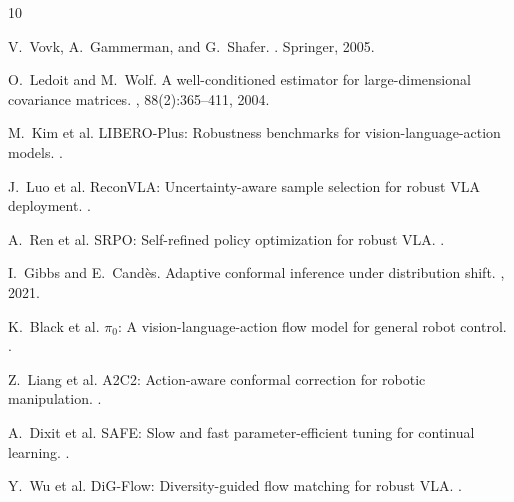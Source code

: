 \documentclass[letterpaper]{article}
\begin{document}
\begin{thebibliography}{10}

V.~Vovk, A.~Gammerman, and G.~Shafer.
.
\newblock Springer, 2005.

O.~Ledoit and M.~Wolf.
\newblock A well-conditioned estimator for large-dimensional covariance matrices.
, 88(2):365--411, 2004.

M.~Kim et al.
\newblock LIBERO-Plus: Robustness benchmarks for vision-language-action models.
.

J.~Luo et al.
\newblock ReconVLA: Uncertainty-aware sample selection for robust VLA deployment.
.

A.~Ren et al.
\newblock SRPO: Self-refined policy optimization for robust VLA.
.

I.~Gibbs and E.~Cand\`es.
\newblock Adaptive conformal inference under distribution shift.
, 2021.

K.~Black et al.
\newblock $\pi_0$: A vision-language-action flow model for general robot control.
.

Z.~Liang et al.
\newblock A2C2: Action-aware conformal correction for robotic manipulation.
.

A.~Dixit et al.
\newblock SAFE: Slow and fast parameter-efficient tuning for continual learning.
.

Y.~Wu et al.
\newblock DiG-Flow: Diversity-guided flow matching for robust VLA.
.

\end{thebibliography}
\end{document}
